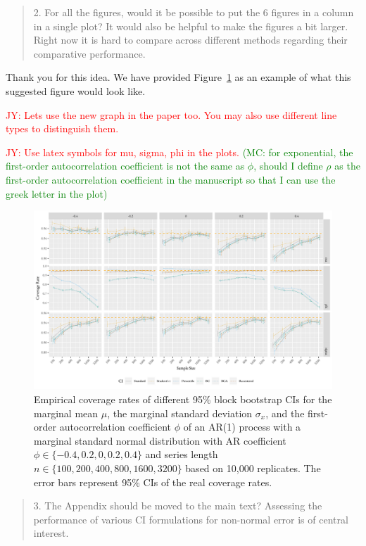 \documentclass[12pt]{article}
\newcommand{\jy}[1]{\textcolor{red}{JY: #1}}
\newcommand{\mc}[1]{\textcolor{green}{(MC: #1)}}
\newenvironment{comment}%
{\begin{quotation}\noindent\small\it\color{darkblue}\ignorespaces%
}{\end{quotation}}
\begin{document}
\begin{comment}
2. For all the figures, would it be possible to put the 6 figures in a column in 
a single plot? It would also be helpful to make the figures a bit larger. Right 
now it is hard to compare across different methods regarding their comparative 
performance.
\end{comment}


Thank you for this idea. We have provided Figure~\ref{fig:norm1} as an 
example of what this suggested figure
would look like.

\jy{Lets use the new graph in the paper too. You may also use
  different line types to distinguish them.}

\jy{Use latex symbols for mu, sigma, phi in the plots.}
\mc{for exponential, the first-order autocorrelation coefficient
is not the same as $\phi$, should I define $\rho$ as the first-order 
autocorrelation coefficient in the manuscript so that I can use the greek letter
in the plot}

\begin{figure}[tbp]
  \centering
  \includegraphics[width=\textwidth]{figures/alt_plot_norm1}
  \caption{Empirical coverage rates of different 95\% block bootstrap CIs for
    the marginal mean $\mu$, the marginal standard deviation $\sigma_x$, and
    the first-order autocorrelation coefficient $\phi$ of an AR(1) process with 
    a marginal standard 
    normal distribution with AR coefficient
    $\phi \in \{-0.4, 0.2, 0, 0.2, 0.4\}$ and series length
    $n \in \{100, 200, 400, 800, 1600, 3200\}$ based on 10,000 replicates. The
    error bars represent 95\% CIs of the real coverage rates.}
  \label{fig:norm1}
\end{figure}


\begin{comment}
3. The Appendix should be moved to the main text? Assessing the performance of 
various CI formulations for non-normal error is of central interest.
\end{comment} 
\end{document}

